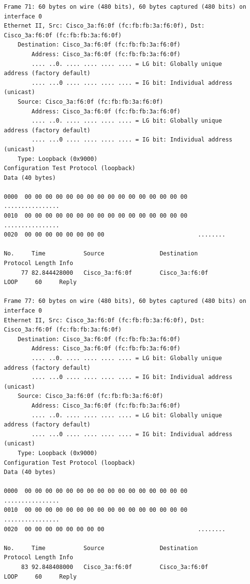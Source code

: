 \documentclass[a4paper,11pt]{article}
\begin{document}
\begin{lstlisting}
Frame 71: 60 bytes on wire (480 bits), 60 bytes captured (480 bits) on interface 0
Ethernet II, Src: Cisco_3a:f6:0f (fc:fb:fb:3a:f6:0f), Dst: Cisco_3a:f6:0f (fc:fb:fb:3a:f6:0f)
    Destination: Cisco_3a:f6:0f (fc:fb:fb:3a:f6:0f)
        Address: Cisco_3a:f6:0f (fc:fb:fb:3a:f6:0f)
        .... ..0. .... .... .... .... = LG bit: Globally unique address (factory default)
        .... ...0 .... .... .... .... = IG bit: Individual address (unicast)
    Source: Cisco_3a:f6:0f (fc:fb:fb:3a:f6:0f)
        Address: Cisco_3a:f6:0f (fc:fb:fb:3a:f6:0f)
        .... ..0. .... .... .... .... = LG bit: Globally unique address (factory default)
        .... ...0 .... .... .... .... = IG bit: Individual address (unicast)
    Type: Loopback (0x9000)
Configuration Test Protocol (loopback)
Data (40 bytes)

0000  00 00 00 00 00 00 00 00 00 00 00 00 00 00 00 00   ................
0010  00 00 00 00 00 00 00 00 00 00 00 00 00 00 00 00   ................
0020  00 00 00 00 00 00 00 00                           ........

No.     Time           Source                Destination           Protocol Length Info
     77 82.844428000   Cisco_3a:f6:0f        Cisco_3a:f6:0f        LOOP     60     Reply

Frame 77: 60 bytes on wire (480 bits), 60 bytes captured (480 bits) on interface 0
Ethernet II, Src: Cisco_3a:f6:0f (fc:fb:fb:3a:f6:0f), Dst: Cisco_3a:f6:0f (fc:fb:fb:3a:f6:0f)
    Destination: Cisco_3a:f6:0f (fc:fb:fb:3a:f6:0f)
        Address: Cisco_3a:f6:0f (fc:fb:fb:3a:f6:0f)
        .... ..0. .... .... .... .... = LG bit: Globally unique address (factory default)
        .... ...0 .... .... .... .... = IG bit: Individual address (unicast)
    Source: Cisco_3a:f6:0f (fc:fb:fb:3a:f6:0f)
        Address: Cisco_3a:f6:0f (fc:fb:fb:3a:f6:0f)
        .... ..0. .... .... .... .... = LG bit: Globally unique address (factory default)
        .... ...0 .... .... .... .... = IG bit: Individual address (unicast)
    Type: Loopback (0x9000)
Configuration Test Protocol (loopback)
Data (40 bytes)

0000  00 00 00 00 00 00 00 00 00 00 00 00 00 00 00 00   ................
0010  00 00 00 00 00 00 00 00 00 00 00 00 00 00 00 00   ................
0020  00 00 00 00 00 00 00 00                           ........

No.     Time           Source                Destination           Protocol Length Info
     83 92.848408000   Cisco_3a:f6:0f        Cisco_3a:f6:0f        LOOP     60     Reply


\end{lstlisting}
\end{document}
